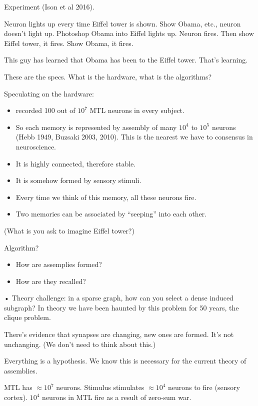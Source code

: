 Experiment (Ison et al 2016).

Neuron lights up every time Eiffel tower is shown. Show Obama, etc., neuron doesn't light up. Photoshop Obama into Eiffel lights up. Neuron fires. Then show Eiffel tower, it fires. Show Obama, it fires. 

This guy has learned that Obama has been to the Eiffel tower. That's learning. %

These are the specs. What is the hardware, what is the algorithms?



Speculating on the hardware:
\begin{itemize}
\item
recorded 100 out of $10^7$ MTL neurons in every subject.
\item
So each memory is represented by assembly of many $10^4$ to $10^5$ neurons (Hebb 1949, Buzsaki 2003, 2010). This is the nearest we have to consensus in neuroscience.
\item
It is highly connected, therefore stable.
\item
It is somehow formed by sensory stimuli. 
\item
Every time we think of this memory, all these neurons fire.
\item
Two memories can be associated by ``seeping'' into each other.
\end{itemize}
(What is you ask to imagine Eiffel tower?)

Algorithm?
\begin{itemize}
\item
How are assemplies formed?
\item
How are they recalled?
\end{itemize}•
Theory challenge: in a sparse graph, how can you select a dense induced subgraph? In theory we have been haunted by this problem for 50 years, the clique problem.

There's evidence that synapses are changing, new ones are formed. It's not unchanging. (We don't need to think about this.)

Everything is a hypothesis. We know this is necessary for the current theory of assemblies.


MTL has $\approx 10^7$ neurons. Stimulus stimulates $\approx 10^4$ neurons to fire (sensory cortex). $10^4$ neurons in MTL fire as a result of zero-sum war. 


